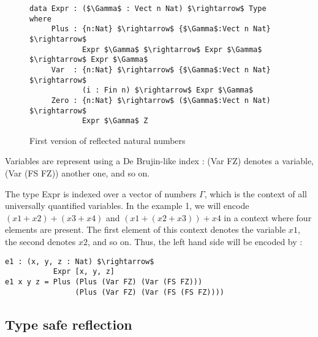 \begin{figure}[H]
\figrule
\begin{center}
\begin{lstlisting}
data Expr : ($\Gamma$ : Vect n Nat) $\rightarrow$ Type where
     Plus : {n:Nat} $\rightarrow$ {$\Gamma$:Vect n Nat} $\rightarrow$ 
            Expr $\Gamma$ $\rightarrow$ Expr $\Gamma$ $\rightarrow$ Expr $\Gamma$
     Var  : {n:Nat} $\rightarrow$ {$\Gamma$:Vect n Nat} $\rightarrow$ 
            (i : Fin n) $\rightarrow$ Expr $\Gamma$
     Zero : {n:Nat} $\rightarrow$ ($\Gamma$:Vect n Nat) $\rightarrow$ 
            Expr $\Gamma$ Z
\end{lstlisting}
\end{center}
\caption{First version of reflected natural numbers}
\label{reflectedNaturalNumbers0}
\figrule
\end{figure}


Variables are represent using a De Brujin-like index : (Var FZ) denotes a variable, (Var (FS FZ)) another one, and so on.

The type Expr is indexed over a vector of numbers $\Gamma$, which is the context of all universally quantified variables. In the example 1, we will encode $(x1 + x2) + (x3 + x4)$ and $(x1 + (x2 + x3)) + x4$ in a context where four elements are present. The first element of this context denotes the variable $x1$, the second denotes $x2$, and so on.
Thus, the left hand side will be encoded by :

\begin{lstlisting}
e1 : (x, y, z : Nat) $\rightarrow$ 
           Expr [x, y, z]
e1 x y z = Plus (Plus (Var FZ) (Var (FS FZ))) 
                (Plus (Var FZ) (Var (FS (FS FZ))))
\end{lstlisting}


\subsection{Type safe reflection}

